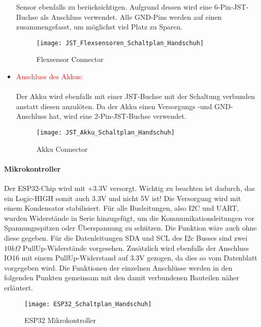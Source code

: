 \documentclass[titlepage,12pt,twoside]{article}
\begin{document}
\begin{itemize}
		  Sensor ebenfalls zu berücksichtigen. Aufgrund dessen wird eine 6-Pin-JST-Buchse als Anschluss verwendet. Alle GND-Pins
		  werden auf einen zusammengefasst, um möglichst viel Platz zu Sparen. \\
		  \begin{figure}[H]
			\begin{center}
				\scalebox{0.5}
				{\texttt{[image: JST\_Flexsensoren\_Schaltplan\_Handschuh]}}
				\caption{Flexsensor Connector}
				\label{fig:JST_Flexsensoren_Schaltplan_Handschuh}				
			\end{center}
		\end{figure}
	\item \textcolor{red}{Anschluss des Akkus:} \\
		  \\
		  Der Akku wird ebenfalls mit einer JST-Buchse mit der Schaltung verbunden anstatt diesen anzulöten. Da der Akku einen
		  Versorgungs -und GND-Anschluss hat, wird eine 2-Pin-JST-Buchse verwendet. \\
		  \begin{figure}[H]
			\begin{center}
				\scalebox{0.5}
				{\texttt{[image: JST\_Akku\_Schaltplan\_Handschuh]}}
				\caption{Akku Connector}
				\label{fig:JST_Akku_Schaltplan_Handschuh}				
			\end{center}
		\end{figure}\end{itemize}

\paragraph{Mikrokontroller} 
\hfill \break
\hfill \break
Der ESP32-Chip wird mit +3.3V versorgt. Wichtig zu beachten ist dadurch, das ein Logic-HIGH somit auch 3.3V und nicht 5V ist!
Die Versorgung wird mit einem Kondensator stabilisiert. Für alle Busleitungen, also I2C und UART, wurden Widerstände in Serie
hinzugefügt, um die Kommunikationsleitungen vor Spannungsspitzen oder Überspannung zu schützen. Die Funktion wäre auch ohne diese
gegeben. Für die Datenleitungen SDA und SCL des I2c Busses sind zwei $10k\Omega$ PullUp-Widerstände vorgesehen. Zusätzlich 
wird ebenfalls der Anschluss IO16 mit einem PullUp-Widerstand auf 3.3V gezogen, da dies so vom Datenblatt vorgegeben wird. 
Die Funktionen der einzelnen Anschlüsse werden in den folgenden Punkten gemeinsam mit den damit verbundenen Bauteilen näher erläutert. \\
\begin{figure}[H]
	\begin{center}
		\scalebox{0.5}
		{\texttt{[image: ESP32\_Schaltplan\_Handschuh]}}
		\caption{ESP32 Mikrokontroller}
		\label{fig:ESP32_Schaltplan_Handschuh}	
	\end{center}
\end{figure}
\end{document}

